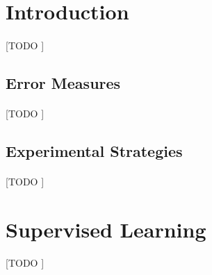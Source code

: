 \documentclass{article}
\begin{document}
	\maketitle %

	\thispagestyle{fancy} %



	\begin{abstract}
		\noindent [TODO ].
	\end{abstract}



	\section{Introduction}
	\label{sec:intro}

			\paragraph{}
			[TODO ]

			\subsection{Error Measures}

				\paragraph{}
				[TODO ]

			\subsection{Experimental Strategies}

				\paragraph{}
				[TODO ]

	\section{Supervised Learning}
	\label{sec:supervised-learning}

		\paragraph{}
		[TODO ]
\end{document}
